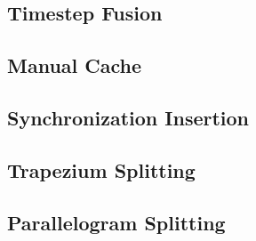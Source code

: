 \documentclass{article}
\begin{document}
\subsection{Timestep Fusion}
\subsection{Manual Cache}
\subsection{Synchronization Insertion}
\subsection{Trapezium Splitting}
\subsection{Parallelogram Splitting}




\end{document}
